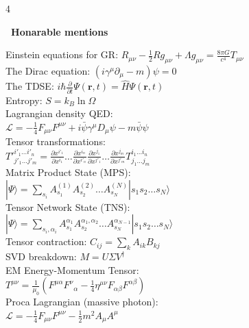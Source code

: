 \documentclass[a4paper,twoside]{article}
\newcommand{\secblock}[1]{%
\par\vspace{1.5pt}%
\noindent\colorbox{hdrcol}{\parbox[c][0.95em][c]{0.99\linewidth}{\color{white}\bfseries\scriptsize \ #1}}\par
\vspace{0.8pt}%
}
\begin{document}
\begin{multicols*}{4}
\secblock{Honarable mentions}
Einstein equations for GR: \(R_{\mu\nu} - \frac{1}{2}R g_{\mu\nu} + \Lambda g_{\mu\nu} = \frac{8\pi G}{c^4} T_{\mu\nu}\) \\
The Dirac equation: \((i\gamma^\mu \partial_\mu - m)\psi = 0\) \\
The TDSE: \(i\hbar \frac{\partial}{\partial t} \Psi(\mathbf{r}, t) = \hat{H} \Psi(\mathbf{r}, t)\) \\
Entropy: \(S = k_B \ln \Omega\) \\
Lagrangian density QED: \\
\(\mathcal{L} = -\frac{1}{4}F_{\mu\nu}F^{\mu\nu} + i\bar{\psi}\gamma^\mu D_\mu \psi - m\bar{\psi}\psi\) \\
Tensor transformations: \\
\(T'^{i'_1 \dots i'_n}_{j'_1 \dots j'_m} = \frac{\partial x^{i'_1}}{\partial x^{i_1}} \dots \frac{\partial x^{i_n}}{\partial x^{i'_n}} \frac{\partial x^{j_1}}{\partial x^{j'_1}} \dots \frac{\partial x^{j_m}}{\partial x^{j'_m}} T^{i_1 \dots i_n}_{j_1 \dots j_m}\) \\
Matrix Product State (MPS): \\
\(|\Psi\rangle = \sum_{s_i} A^{(1)}_{s_1} A^{(2)}_{s_2} \dots A^{(N)}_{s_N} |s_1 s_2 \dots s_N\rangle\) \\
Tensor Network State (TNS): \\
\(|\Psi\rangle = \sum_{s_i,\alpha_i} A_{s_1}^{\alpha_1} A^{ \alpha_1, \alpha_2}_{s_2} \dots A^{\alpha_{N-1}}_{s_N} |s_1 s_2 \dots s_N\rangle\) \\
Tensor contraction: \(C_{ij} = \sum_{k} A_{ik} B_{kj}\) \\
SVD breakdown: \(M = U \Sigma V^\dagger\) \\
EM Energy-Momentum Tensor: \\
$T^{\mu\nu} = \frac{1}{\mu_0}\left(F^{\mu\alpha}F^\nu{}_\alpha - \frac{1}{4}\eta^{\mu\nu}F_{\alpha\beta}F^{\alpha\beta}\right)$ \\
Proca Lagrangian (massive photon): \\
$\mathcal{L} = -\frac{1}{4}F_{\mu\nu}F^{\mu\nu} - \frac{1}{2}m^2 A_\mu A^\mu$

\end{multicols*}
\end{document}
